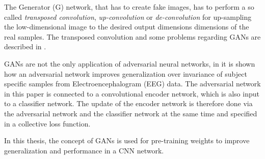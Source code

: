 The Generator (G) network, that has to create fake images, has to perform a so called \emph{transposed convolution}, \emph{up-convolution} or \emph{de-convolution} for up-sampling the low-dimensional image to the desired output dimensions dimensions of the real samples.
The transposed convolution and some problems regarding GANs are described in \cite{Durall2020}.

GANs are not the only application of adversarial neural networks, in \cite{Oezdenizci2020} it is shown how an adversarial network improves generalization over invariance of subject specific samples from Electroencephalogram (EEG) data.
The adversarial network in this paper is connected to a convolutional encoder network, which is also input to a classifier network.
The update of the encoder network is therefore done via the adversarial network and the classifier network at the same time and specified in a collective loss function.

In this thesis, the concept of GANs is used for pre-training weights to improve generalization and performance in a CNN network.
